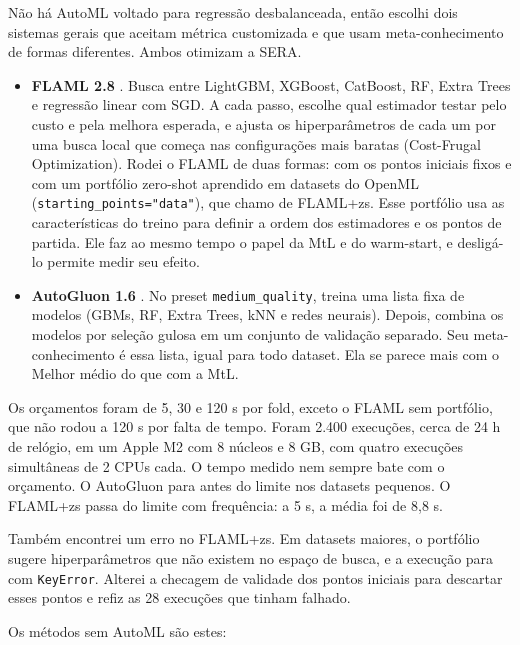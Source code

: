 \documentclass[10pt,a4paper]{article}
\begin{document}
Não há AutoML voltado para regressão desbalanceada, então escolhi dois sistemas gerais que aceitam métrica customizada e que usam meta-conhecimento de formas diferentes. Ambos otimizam a SERA.

\begin{itemize}
\item \textbf{FLAML 2.8} \cite{flaml}. Busca entre LightGBM, XGBoost, CatBoost, RF, Extra Trees e regressão linear com SGD. A cada passo, escolhe qual estimador testar pelo custo e pela melhora esperada, e ajusta os hiperparâmetros de cada um por uma busca local que começa nas configurações mais baratas (Cost-Frugal Optimization). Rodei o FLAML de duas formas: com os pontos iniciais fixos e com um portfólio zero-shot aprendido em datasets do OpenML (\texttt{starting\_points="data"}), que chamo de FLAML+zs. Esse portfólio usa as características do treino para definir a ordem dos estimadores e os pontos de partida. Ele faz ao mesmo tempo o papel da MtL e do warm-start, e desligá-lo permite medir seu efeito.
\item \textbf{AutoGluon 1.6} \cite{autogluon}. No preset \texttt{medium\_quality}, treina uma lista fixa de modelos (GBMs, RF, Extra Trees, kNN e redes neurais). Depois, combina os modelos por seleção gulosa em um conjunto de validação separado. Seu meta-conhecimento é essa lista, igual para todo dataset. Ela se parece mais com o Melhor médio do que com a MtL.
\end{itemize}

Os orçamentos foram de 5, 30 e 120 s por fold, exceto o FLAML sem portfólio, que não rodou a 120 s por falta de tempo. Foram 2.400 execuções, cerca de 24 h de relógio, em um Apple M2 com 8 núcleos e 8 GB, com quatro execuções simultâneas de 2 CPUs cada. O tempo medido nem sempre bate com o orçamento. O AutoGluon para antes do limite nos datasets pequenos. O FLAML+zs passa do limite com frequência: a 5 s, a média foi de 8,8 s.

Também encontrei um erro no FLAML+zs. Em datasets maiores, o portfólio sugere hiperparâmetros que não existem no espaço de busca, e a execução para com \texttt{KeyError}. Alterei a checagem de validade dos pontos iniciais para descartar esses pontos e refiz as 28 execuções que tinham falhado.

Os métodos sem AutoML são estes:
\end{document}
